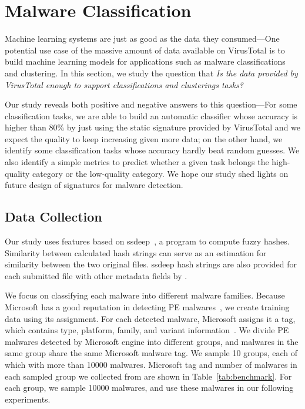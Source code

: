 \section{Malware Classification}
\label{sec:ssdeep}

Machine learning systems are just as good
as the data they consumed---One potential 
use case of the massive amount of data 
available on VirusTotal is to build 
machine learning models for applications
such as malware classifications and
clustering. In this section, we study
the question that {\em Is the data
provided by VirusTotal enough to support
classifications and clusterings tasks?}

Our study reveals both positive and
negative answers to this question---For
some classification tasks, we are able
to build an automatic classifier whose
accuracy is higher than 80\% by just
using the static signature provided by VirusTotal
and we expect the quality to keep increasing
given more data; on the other hand,
we identify some classification tasks
whose accuracy hardly beat random guesses.
We also identify a simple metrics
to predict whether a given task belongs
the high-quality category or the low-quality
category. We hope our study shed lights
on future design of signatures for malware
detection.



\subsection{Data Collection}



Our study uses features based on ssdeep~\cite{ssdeep}, a program to compute fuzzy hashes. 
Similarity between calculated hash strings can serve as an estimation for similarity between the two original files. 
ssdeep hash strings are also provided for each submitted file with other metadata fields by \vt. 

We focus on classifying each malware into
different malware families. Because Microsoft 
has a good reputation in detecting PE malwares~\cite{SongAPsys2016}, we create training
data using its assignment. For each detected malware, 
Microsoft assigns it a tag, which contains type, platform, family, 
and variant information~\cite{microsoft}. 
We divide PE malwares detected by Microsoft engine into different groups, 
and malwares in the same group share the same Microsoft malware tag. 
We sample 10 groups, each of which with more than 10000 malwares.  
Microsoft tag and number of malwares in each sampled group we collected from \vt{} 
are shown in Table~\ref{tab:benchmark}. 
For each group, we sample 10000 malwares, and use these malwares in our following experiments. 

